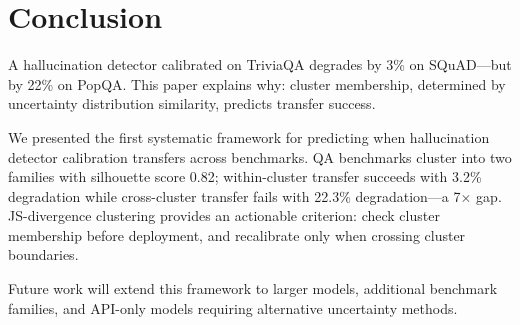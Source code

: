 \section{Conclusion}

A hallucination detector calibrated on TriviaQA degrades by 3\% on SQuAD---but by 22\% on PopQA. This paper explains why: cluster membership, determined by uncertainty distribution similarity, predicts transfer success.

We presented the first systematic framework for predicting when hallucination detector calibration transfers across benchmarks. QA benchmarks cluster into two families with silhouette score 0.82; within-cluster transfer succeeds with 3.2\% degradation while cross-cluster transfer fails with 22.3\% degradation---a 7$\times$ gap. JS-divergence clustering provides an actionable criterion: check cluster membership before deployment, and recalibrate only when crossing cluster boundaries.

Future work will extend this framework to larger models, additional benchmark families, and API-only models requiring alternative uncertainty methods.
